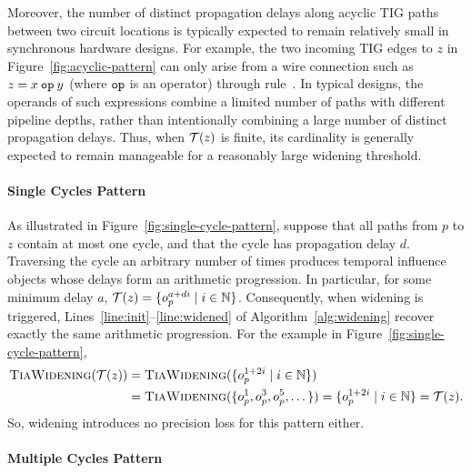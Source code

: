 Moreover, the number of distinct propagation delays along acyclic TIG paths between two circuit locations is typically expected to remain relatively small in synchronous hardware designs.
For example, the two incoming TIG edges to $z$ in Figure~\ref{fig:acyclic-pattern} can only arise from a wire connection such as $z = x \mathbin{\mathtt{ op }} y$ (where $\mathtt{ op }$ is an operator) through rule~\rTiaWire.
In typical designs, the operands of such expressions combine a limited number of paths with different pipeline depths, rather than intentionally combining a large number of distinct propagation delays.
Thus, when $\mathcal{T}(z)$ is finite, its cardinality is generally expected to remain manageable for a reasonably large widening threshold.

\paragraph{Single Cycles Pattern}

As illustrated in Figure~\ref{fig:single-cycle-pattern}, suppose that all paths from $p$ to $z$ contain at most one cycle, and that the cycle has propagation delay $d$.
Traversing the cycle an arbitrary number of times produces temporal influence objects whose delays form an arithmetic progression.
In particular, for some minimum delay $a$, $\mathcal{T}(z) = \{o_p^{a + di} \mid i \in \mathbb{N}\}$.
Consequently, when widening is triggered, Lines~\ref{line:init}--\ref{line:widened} of Algorithm~\ref{alg:widening} recover exactly the same arithmetic progression.
For the example in Figure~\ref{fig:single-cycle-pattern},
\[
\begin{aligned}
    \textsc{TiaWidening}(\mathcal{T}(z)) & = \textsc{TiaWidening}(\{o_p^{1+2i} \mid i\in \mathbb{N}\})\\
    & = \textsc{TiaWidening}(\{o_p^1, o_p^3, o_p^5, \dots\}) = \{o_p^{1+2i} \mid i \in \mathbb{N}\} = \mathcal{T}(z).\\
\end{aligned}
\]
So, widening introduces no precision loss for this pattern either.

\paragraph{Multiple Cycles Pattern}

